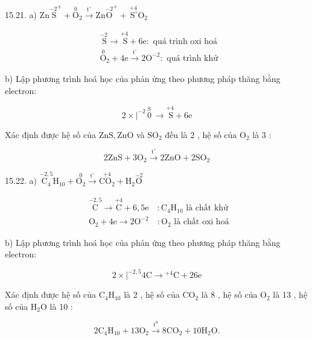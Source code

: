 \documentclass[10pt]{article}
\begin{document}
15.21. a) $\mathrm{Zn} \stackrel{-2}{\mathrm{~S}}^{+}+\stackrel{0}{\mathrm{O}}_{2} \xrightarrow{\mathrm{t}^{\circ}} \mathrm{Zn} \stackrel{-2}{\mathrm{O}}^{+}+\stackrel{+4}{\mathrm{~S}^{\circ}} \mathrm{O}_{2}$

$$
\begin{aligned}
& \stackrel{-2}{\mathrm{~S}} \longrightarrow \stackrel{+4}{\mathrm{~S}}+6 \mathrm{e}: \text { quá trình oxi hoá } \\
& \stackrel{0}{\mathrm{O}}_{2}+4 \mathrm{e} \xrightarrow{\mathrm{t}^{\circ}} 2 \mathrm{O}^{-2}: \text { quá trình khử }
\end{aligned}
$$

b) Lập phương trình hoá học của phản ứng theo phương pháp thăng bằng electron:

$$
2 \times\left.\right|^{-2} \stackrel{\text { S }}{0} \longrightarrow \stackrel{+4}{\mathrm{~S}}+6 \mathrm{e}
$$

Xác định được hệ số của $\mathrm{ZnS}, \mathrm{ZnO}$ và $\mathrm{SO}_{2}$ đều là 2 , hệ số của $\mathrm{O}_{2}$ là 3 :

$$
2 \mathrm{ZnS}+3 \mathrm{O}_{2} \xrightarrow{\mathrm{t}^{\circ}} 2 \mathrm{ZnO}+2 \mathrm{SO}_{2}
$$

15.22. a) $\stackrel{-2,5}{\mathrm{C}_{4}} \mathrm{H}_{10}+\stackrel{0}{\mathrm{O}_{2}} \xrightarrow{\mathrm{t}^{\circ}} \stackrel{+4}{\mathrm{CO}_{2}}+\mathrm{H}_{2} \stackrel{-2}{\mathrm{O}}$

$$
\begin{aligned}
& \stackrel{-2,5}{\mathrm{C}} \longrightarrow \stackrel{+4}{\mathrm{C}}+6,5 \mathrm{e} \quad: \mathrm{C}_{4} \mathrm{H}_{10} \text { là chất khử } \\
& \mathrm{O}_{2}+4 \mathrm{e} \longrightarrow 2 \mathrm{O}^{-2} \quad: \mathrm{O}_{2} \text { là chất oxi hoá }
\end{aligned}
$$

b) Lập phương trình hoá học của phản ứng theo phương pháp thăng bằng electron:

$$
2 \times\left.\right|^{-2,5} 4 \mathrm{C} \longrightarrow{ }^{+4} \mathrm{C}+26 \mathrm{e}
$$

Xác định được hệ số của $\mathrm{C}_{4} \mathrm{H}_{10}$ là 2 , hệ số của $\mathrm{CO}_{2}$ là 8 , hệ số của $\mathrm{O}_{2}$ là 13 , hệ số của $\mathrm{H}_{2} \mathrm{O}$ là 10 :

$$
2 \mathrm{C}_{4} \mathrm{H}_{10}+13 \mathrm{O}_{2} \xrightarrow{\mathrm{t}^{0}} 8 \mathrm{CO}_{2}+10 \mathrm{H}_{2} \mathrm{O} .
$$
\end{document}
